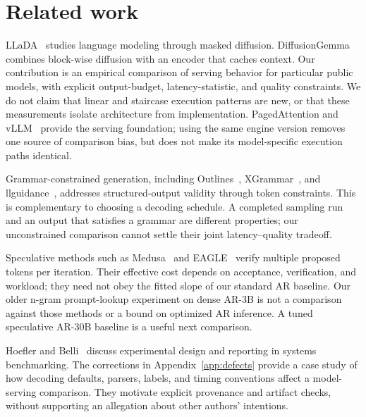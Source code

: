 \section{Related work}
\label{sec:related}

LLaDA~\cite{llada2025} studies language modeling through masked
diffusion. DiffusionGemma~\cite{diffusiongemma} combines block-wise
diffusion with an encoder that caches context. Our contribution is an
empirical comparison of serving behavior for particular public models,
with explicit output-budget, latency-statistic, and quality constraints.
We do not claim that linear and staircase execution patterns are new,
or that these measurements isolate architecture from implementation.
PagedAttention and vLLM~\cite{vllm2023} provide the serving foundation;
using the same engine version removes one source of comparison bias,
but does not make its model-specific execution paths identical.

Grammar-constrained generation, including Outlines~\cite{outlines2024},
XGrammar~\cite{xgrammar2024}, and llguidance~\cite{llguidance},
addresses structured-output validity through token constraints.
This is complementary to choosing a decoding schedule. A completed
sampling run and an output that satisfies a grammar are different
properties; our unconstrained comparison cannot settle their joint
latency--quality tradeoff.

Speculative methods such as Medusa~\cite{medusa2024} and
EAGLE~\cite{eagle2024} verify multiple proposed tokens per iteration.
Their effective cost depends on acceptance, verification, and workload;
they need not obey the fitted slope of our standard AR baseline.
Our older n-gram prompt-lookup experiment on dense AR-3B is not a
comparison against those methods or a bound on optimized AR inference.
A tuned speculative AR-30B baseline is a useful next comparison.

Hoefler and Belli~\cite{hoefler2015} discuss experimental design and
reporting in systems benchmarking. The corrections in
Appendix~\ref{app:defects} provide a case study of how decoding
defaults, parsers, labels, and timing conventions affect a model-serving
comparison. They motivate explicit provenance and artifact checks,
without supporting an allegation about other authors' intentions.
